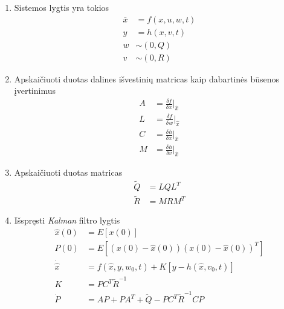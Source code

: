         \begin{enumerate}
            \item Sistemos lygtis yra tokios
            \begin{equation}
                \begin{aligned}
                \bar{x} &= f(x, u, w, t) \\
                y &= h(x, v, t) \\
                w &\sim (0,Q) \\
                v &\sim (0, R)
                \end{aligned}
            \end{equation}
            \item Apskaičiuoti duotas dalines išvestinių matricas kaip dabartinės būsenos įvertinimus
            \begin{equation}
                \begin{aligned}
                    A &= \frac{\delta f}{\delta x}\Bigr|_{\hat{x}} \\
                    L &= \frac{\delta f}{\delta w}\Bigr|_{\hat{x}} \\
                    C &= \frac{\delta h}{\delta x}\Bigr|_{\hat{x}} \\
                    M &= \frac{\delta h}{\delta v}\Bigr|_{\hat{x}}
                \end{aligned}
            \end{equation}
            \item Apskaičiuoti duotas matricas
            \begin{equation}
                \label{eq:ekf_q_r}
                \begin{aligned}
                    \tilde{Q} &= LQL^T \\
                    \tilde{R} &= MRM^T
                \end{aligned}
            \end{equation}
            \item Išspręsti \textit{Kalman} filtro lygtis
            \begin{equation}
                \label{eq:ekf}
                \begin{aligned}
                    \hat{x}(0) &= E[x(0)]  \\
                    P(0) &= E[ (x(0) - \hat{x}(0))(x(0) - \hat{x}(0))^T ] \\
                    \dot{\hat{x}} &= f(\hat{x}, y, w_0, t) + K[y - h(\hat{x}, v_0, t)] \\
                    K &= PC^T\tilde{R}^{-1} \\
                    \dot{P} &= AP + PA^T + \tilde{Q} - PC^T\tilde{R}^{-1}CP
                \end{aligned}
            \end{equation}
        \end{enumerate}

